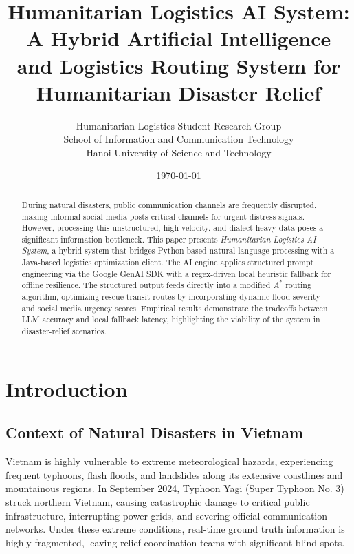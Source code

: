\documentclass[12pt,a4paper]{article}
\title{Humanitarian Logistics AI System: A Hybrid Artificial Intelligence and Logistics Routing System for Humanitarian Disaster Relief}
\author{Humanitarian Logistics Student Research Group \\ School of Information and Communication Technology \\ Hanoi University of Science and Technology}
\date{\today}
\begin{document}
\maketitle

\begin{abstract}
During natural disasters, public communication channels are frequently disrupted, making informal social media posts critical channels for urgent distress signals. However, processing this unstructured, high-velocity, and dialect-heavy data poses a significant information bottleneck. This paper presents \textit{Humanitarian Logistics AI System}, a hybrid system that bridges Python-based natural language processing with a Java-based logistics optimization client. The AI engine applies structured prompt engineering via the Google GenAI SDK with a regex-driven local heuristic fallback for offline resilience. The structured output feeds directly into a modified $A^*$ routing algorithm, optimizing rescue transit routes by incorporating dynamic flood severity and social media urgency scores. Empirical results demonstrate the tradeoffs between LLM accuracy and local fallback latency, highlighting the viability of the system in disaster-relief scenarios.
\end{abstract}

\newpage

\section{Introduction}

\subsection{Context of Natural Disasters in Vietnam}
Vietnam is highly vulnerable to extreme meteorological hazards, experiencing frequent typhoons, flash floods, and landslides along its extensive coastlines and mountainous regions. In September 2024, Typhoon Yagi (Super Typhoon No. 3) struck northern Vietnam, causing catastrophic damage to critical public infrastructure, interrupting power grids, and severing official communication networks. Under these extreme conditions, real-time ground truth information is highly fragmented, leaving relief coordination teams with significant blind spots.
\end{document}
